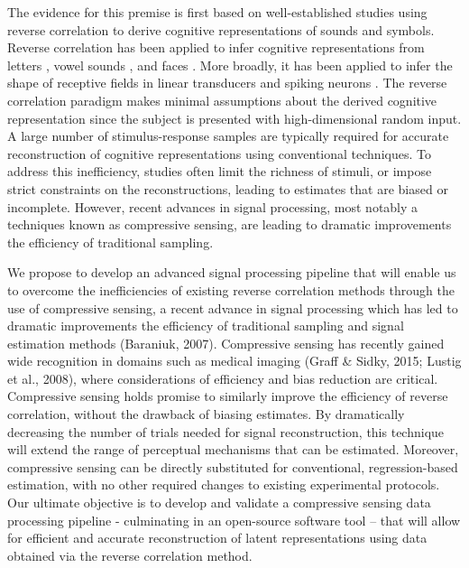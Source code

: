 \documentclass[11pt, notitlepage]{article} %
\begin{document}
The evidence for this premise is first based on well-established studies using reverse correlation
to derive cognitive representations of sounds and symbols.
Reverse correlation has been applied to infer cognitive representations from letters
\cite{gosselinSuperstitiousPerceptionsReveal2003}, vowel sounds \cite{brimijoinInternalRepresentationVowel2013},
and faces \cite{brinkmanVisualisingMentalRepresentations2017,smithMeasuringInternalRepresentations2012}.
More broadly, it has been applied to infer the shape of receptive fields
in linear transducers and spiking neurons \cite{ringachReverseCorrelationNeurophysiology2004}.
The reverse correlation paradigm makes minimal assumptions about the derived cognitive representation
since the subject is presented with high-dimensional random input.
A large number of stimulus-response samples are typically required for accurate
reconstruction of cognitive representations using conventional techniques. To address this inefficiency,
studies often limit the richness of stimuli, or impose strict constraints on the reconstructions, leading to
estimates that are biased or incomplete. However, recent advances in signal processing, most notably
a techniques known as compressive sensing, are leading to dramatic improvements the efficiency of
traditional sampling.

We propose to develop an advanced signal processing pipeline that will enable us to overcome
the inefficiencies of existing reverse correlation methods through the use of compressive sensing, a
recent advance in signal processing which has led to dramatic improvements the efficiency of traditional
sampling and signal estimation methods (Baraniuk, 2007). Compressive sensing has recently gained
wide recognition in domains such as medical imaging (Graff \& Sidky, 2015; Lustig et al., 2008), where
considerations of efficiency and bias reduction are critical. Compressive sensing holds promise to
similarly improve the efficiency of reverse correlation, without the drawback of biasing estimates. By
dramatically decreasing the number of trials needed for signal reconstruction, this technique will extend
the range of perceptual mechanisms that can be estimated. Moreover, compressive sensing can be
directly substituted for conventional, regression-based estimation, with no other required changes to
existing experimental protocols. Our ultimate objective is to develop and validate a compressive sensing
data processing pipeline - culminating in an open-source software tool – that will allow for efficient and
accurate reconstruction of latent representations using data obtained via the reverse correlation method.
\end{document}
